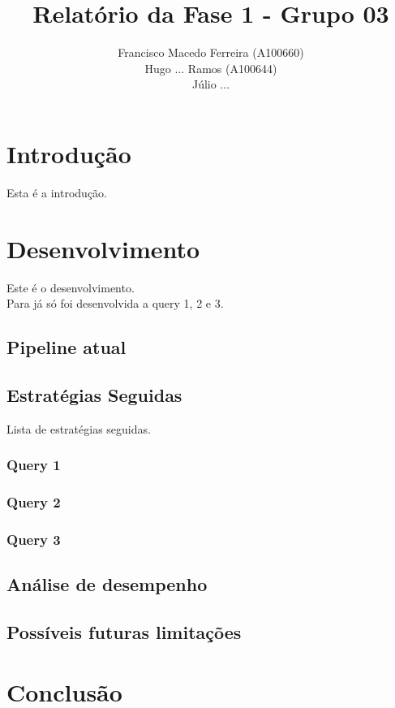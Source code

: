 \documentclass{article}
\title{Relatório da Fase 1 - Grupo 03}
\author{Francisco Macedo Ferreira (A100660)\\Hugo ... Ramos (A100644)\\Júlio ...}
\begin{document}
    \maketitle

    \section{Introdução}

    Esta é a introdução.

    \section{Desenvolvimento}

        Este é o desenvolvimento. 
        \\Para já só foi desenvolvida a query 1, 2 e 3.

        \subsection{Pipeline atual}

        \subsection{Estratégias Seguidas}

        Lista de estratégias seguidas.

        \subsubsection{Query 1}
        \subsubsection{Query 2}
        \subsubsection{Query 3}

        \subsection{Análise de desempenho}
        
        \subsection{Possíveis futuras limitações}

    \section{Conclusão}
\end{document}
